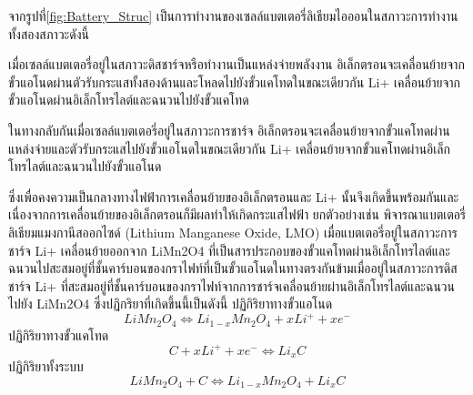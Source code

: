 จากรูปที่\ref{fig:Battery_Struc} เป็นการทำงานของเซลล์แบตเตอรี่ลิเธียมไอออนในสภาวะการทำงานทั้งสองสภาวะดังนี้
\begin{itemize}
	{\item
		เมื่อเซลล์แบตเตอรี่อยู่ในสภาวะดิสชาร์จหรือทำงานเป็นแหล่งจ่ายพลังงาน อิเล็กตรอนจะเคลื่อนย้ายจากขั้วแอโนดผ่านตัวรับกระแสทั้งสองด้านและโหลดไปยังขั้วแคโทดในขณะเดียวกัน Li+ เคลื่อนย้ายจากขั้วแอโนดผ่านอิเล็กโทรไลต์และฉนวนไปยังขั้วแคโทด}
	{\item
		ในทางกลับกันเมื่อเซลล์แบตเตอรี่อยู่ในสภาวะการชาร์จ อิเล็กตรอนจะเคลื่อนย้ายจากขั้วแคโทดผ่านแหล่งจ่ายและตัวรับกระแสไปยังขั้วแอโนดในขณะเดียวกัน Li+ เคลื่อนย้ายจากขั้วแคโทดผ่านอิเล็กโทรไลต์และฉนวนไปยังขั้วแอโนด}
\end{itemize}
 ซึ่งเพื่อคงความเป็นกลางทางไฟฟ้าการเคลื่อนย้ายของอิเล็กตรอนและ Li+ นั้นจึงเกิดขึ้นพร้อมกันและเนื่องจากการเคลื่อนย้ายของอิเล็กตรอนก็มีผลทำให้เกิดกระแสไฟฟ้า
\newline ยกตัวอย่างเช่น พิจารณาแบตเตอรี่ลิเธียมแมงกานีสออกไซด์ (Lithium Manganese Oxide, LMO) เมื่อแบตเตอรี่อยู่ในสภาวะการชาร์จ Li+ เคลื่อนย้ายออกจาก LiMn2O4 ที่เป็นสารประกอบของขั้วแคโทดผ่านอิเล็กโทรไลต์และฉนวนไปสะสมอยู่ที่ชั้นคาร์บอนของกราไฟท์ที่เป็นขั้วแอโนดในทางตรงกันข้ามเมื่ออยู่ในสภาวะการดิสชาร์จ Li+ ที่สะสมอยู่ที่ชั้นคาร์บอนของกราไฟท์จากการชาร์จเคลื่อนย้ายผ่านอิเล็กโทรไลต์และฉนวนไปยัง LiMn2O4 ซึ่งปฏิกริยาที่เกิดขึ้นนี้เป็นดังนี้
 \newline ปฏิกิริยาทางขั้วแอโนด
\begin{equation}
LiMn_{2}O_{4} \Leftrightarrow Li_{1-x}Mn_{2}O_{4}+xLi^{+}+xe^{-} \label{eq:1}
\end{equation}
 \newline ปฏิกิริยาทางขั้วแคโทด
\begin{equation}
C+xLi^{+}+xe^{-} \Leftrightarrow Li_{x}C \label{eq:2}
\end{equation}
\newline ปฏิกิริยาทั้งระบบ
\begin{equation}
LiMn_{2}O_{4}+C \Leftrightarrow Li_{1-x}Mn_{2}O_{4}+Li_{x}C \label{eq:3}
\end{equation}
